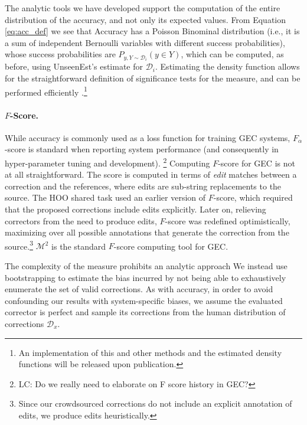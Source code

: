 \documentclass[letterpaper, 11pt]{article}
\newcommand{\lc}[1]{\footnote{\color{blue}LC: #1}}
\begin{document}
The analytic tools we have developed support the computation of the entire distribution of the accuracy, and not only its expected values. From Equation \ref{eq:acc_def} we see that Accuracy has a Poisson Binominal distribution (i.e., it is a sum of independent Bernoulli variables with different success probabilities), whose success probabilities are $P_{y,Y \sim \mathcal{D}_i}(y \in Y)$, which can be computed, as before, using {\sc UnseenEst}'s estimate for $\mathcal{D}_i$. Estimating the density function allows for the straightforward definition of significance tests for the measure, and can be performed efficiently \cite{hong2013computing}.\footnote{An implementation of this and other methods and the estimated density functions will be released upon publication.}

\paragraph{$F$-Score.}
While accuracy is commonly used as a loss function for training GEC systems,
$F_\alpha$-score is standard when reporting system performance (and consequently in hyper-parameter tuning and development). \lc{Do we really need to elaborate on F score history in GEC?}
Computing $F$-score for GEC is not at all straightforward.
The score is computed in terms of {\it edit} matches between a correction and the references, where edits are sub-string replacements to the source.
The HOO shared task used an earlier version of $F$-score, which required that the proposed corrections include edits explicitly.
Later on, relieving correctors from the need to produce edits, $F$-score was redefined optimistically, maximizing over all possible annotations that generate the correction from the source.\footnote{Since our crowdsourced corrections
	do not include an explicit annotation of edits, we produce edits heuristically.}
$\mathcal{M}^2$ \cite{dahlmeier2012better} is the standard $F$-score computing tool for GEC.

The complexity of the measure prohibits an analytic approach \cite{yeh2000more}
We instead use bootstrapping to estimate the bias incurred by not being able to exhaustively enumerate the set of valid corrections.
As with accuracy, in order to avoid confounding our results with system-specific biases,
we assume the evaluated corrector is perfect and sample its corrections from the human distribution of corrections $\mathcal{D}_x$.
\end{document}
